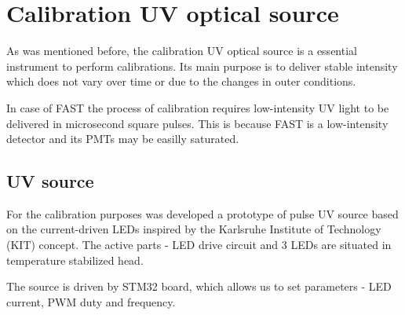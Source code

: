 
\chapter{Calibration UV optical source}
As was mentioned before, the calibration UV optical source is a essential instrument to perform calibrations. Its main purpose is to deliver stable intensity which does not vary over time or due to the changes in outer conditions.
\par
In case of FAST the process of calibration requires low-intensity UV light to be delivered in microsecond square pulses. This is because FAST is a low-intensity detector and its PMTs may be easilly saturated.

\section{UV source}
For the calibration purposes was developed a prototype of pulse UV source based on the current-driven LEDs inspired by the Karlsruhe Institute of Technology (KIT) concept. The active parts - LED drive circuit and 3 LEDs are situated in temperature stabilized head. 
\par
The source is driven by STM32 board, which allows us to set parameters - LED current, PWM duty and frequency.
 



